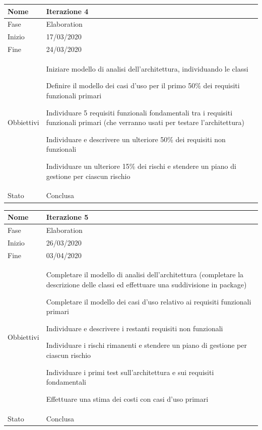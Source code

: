 \begin{center}
\begin{tabular}{ |p{2cm}|p{10cm}|  }
\hline
Nome & Iterazione 4 \\\hline
Fase & Elaboration \\\hline
Inizio & 17/03/2020 \\\hline
Fine &  24/03/2020 \\\hline
Obbiettivi & 
	\begin{compactitem}
		\item Iniziare modello di analisi dell'architettura, individuando le classi
		\item Definire il modello dei casi d'uso per il primo 50\% dei requisiti funzionali primari
		\item Individuare 5 requisiti funzionali fondamentali tra i requisiti funzionali primari (che verranno usati per testare l'architettura)
		\item Individuare e descrivere un ulteriore 50\% dei requisiti non funzionali
		\item Individuare un ulteriore 15\% dei rischi e stendere un piano di gestione per ciascun rischio
	\end{compactitem}\\\hline
Stato &  Conclusa \\\hline
\end{tabular}
\label{table:4}\newline

\begin{tabular}{ |p{2cm}|p{10cm}|  }
\hline
Nome & Iterazione 5 \\\hline
Fase & Elaboration \\\hline
Inizio & 26/03/2020 \\\hline
Fine &  03/04/2020  \\\hline
Obbiettivi & 
	\begin{compactitem}
		\item Completare il modello di analisi dell'architettura (completare la descrizione delle classi ed effettuare una suddivisione in package)
		\item Completare il modello dei casi d'uso relativo ai requisiti funzionali primari
		\item Individuare e descrivere i restanti requisiti non funzionali %
		\item Individuare i rischi rimanenti e stendere un piano di gestione per ciascun rischio %
		\item Individuare i primi test sull'architettura e sui requisiti fondamentali
		\item Effettuare una stima dei costi con casi d'uso primari
	\end{compactitem}\\\hline
Stato &  Conclusa \\\hline
\end{tabular}
\label{table:5}\newline


\end{center}
